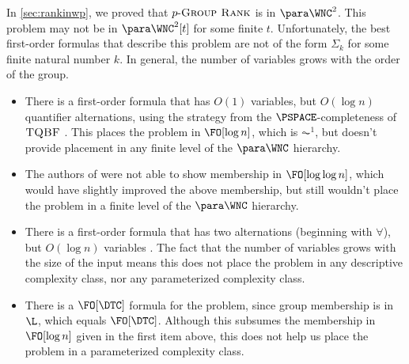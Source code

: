 \documentclass{article}
\newcommand{\dash}{\textnormal{-}}
\newcommand{\pgrouprank}{p\dash\textsc{Group Rank}}
\begin{document}
In \autoref{sec:rankinwp}, we proved that $\pgrouprank$ is in $\para \WNC^2$.
This problem may not be in $\para \WNC^2[t]$ for some finite $t$.
Unfortunately, the best first-order formulas that describe this problem are not of the form $\Sigma_k$ for some finite natural number $k$.
In general, the number of variables grows with the order of the group.
\begin{itemize}
\item
  There is a first-order formula that has $O(1)$ variables, but $O(\log n)$ quantifier alternations, using the strategy from the $\PSPACE$-completeness of $\textsc{TQBF}$ \autocite[Lemma~2.3]{nt16}.
  This places the problem in $\FO[\log n]$, which is $\AC^1$, but doesn't provide placement in any finite level of the $\para \WNC$ hierarchy.
\item
  The authors of \autocite{bklm01} were not able to show membership in $\FO[\log \log n]$, which would have slightly improved the above membership, but still wouldn't place the problem in a finite level of the $\para \WNC$ hierarchy.
\item
  There is a first-order formula that has two alternations (beginning with $\forall$), but $O(\log n)$ variables \autocite[Lemma~3.5]{nt16}.
  The fact that the number of variables grows with the size of the input means this does not place the problem in any descriptive complexity class, nor any parameterized complexity class.
\item
  There is a $\FO[\DTC]$ formula for the problem, since group membership is in $\L$, which equals $\FO[\DTC]$.
  Although this subsumes the membership in $\FO[\log n]$ given in the first item above, this does not help us place the problem in a parameterized complexity class.
\end{itemize}
\end{document}
